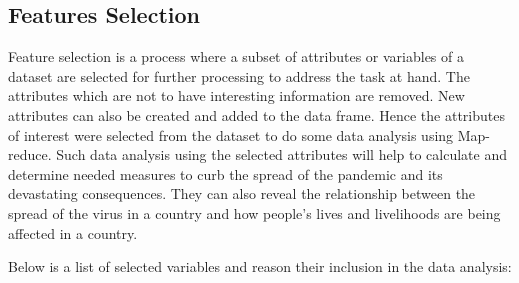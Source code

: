 \documentclass[12pt,letterpaper, twoside]{article}
\begin{document}
\subsection{Features Selection}
Feature selection is a process where a subset of attributes or variables of a dataset are selected for further processing to address the task at hand. The attributes which are  not to have interesting information are removed. New  attributes can also be created and added to the data frame. Hence the  attributes  of interest were selected from the dataset  to do some data analysis using Map-reduce.  Such data analysis using the selected attributes will help to calculate and determine needed measures to curb the spread of the pandemic and its devastating consequences. They can also reveal the relationship between the spread of the virus in a country and how people's lives and livelihoods are being affected in a country.

Below is a list of selected variables and reason their inclusion in the data analysis:
\end{document}
